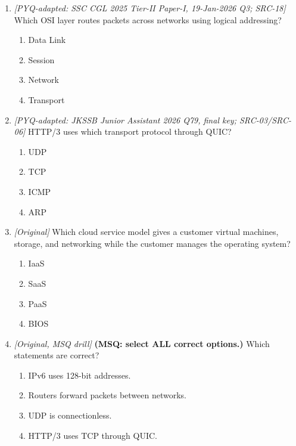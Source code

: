 \begin{enumerate}[label=\textbf{Q\arabic*.}, leftmargin=*]
\item \textit{[PYQ-adapted: SSC CGL 2025 Tier-II Paper-I, 19-Jan-2026 Q3; SRC-18]} Which OSI layer routes packets across networks using logical addressing?
  \begin{enumerate}[label=\Alph*.]
\item Data Link
   \item Session
   \item Network
   \item Transport
  \end{enumerate}

\item \textit{[PYQ-adapted: JKSSB Junior Assistant 2026 Q79, final key; SRC-03/SRC-06]} HTTP/3 uses which transport protocol through QUIC?
  \begin{enumerate}[label=\Alph*.]
\item UDP
   \item TCP
   \item ICMP
   \item ARP
  \end{enumerate}

\item \textit{[Original]} Which cloud service model gives a customer virtual machines, storage, and networking while the customer manages the operating system?
  \begin{enumerate}[label=\Alph*.]
\item IaaS
   \item SaaS
   \item PaaS
   \item BIOS
  \end{enumerate}

\item \textit{[Original, MSQ drill]} \textbf{(MSQ: select ALL correct options.)} Which statements are correct?
  \begin{enumerate}[label=\Alph*.]
\item IPv6 uses 128-bit addresses.
   \item Routers forward packets between networks.
   \item UDP is connectionless.
   \item HTTP/3 uses TCP through QUIC.
  \end{enumerate}

\end{enumerate}
